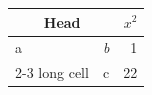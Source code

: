 \documentclass{article}
\begin{document}
\begin{center}
\begin{tabular}{|l|c||r|}
\hline
\multicolumn{2}{|c|}{Head} & $x^2$ \\
\hline
a & \textit{b} & 1 \\ \cline{2-3}
long cell & c & 22 \\
\hline
\end{tabular}
\end{center}
\end{document}
